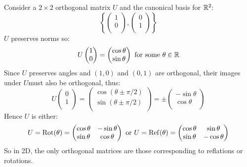 \documentclass[../main.tex]{subfiles}
\begin{document}
\begin{example}
  \label{orthoExampleR2}
  Consider a $2 \times 2$ orthogonal matrix $U$ and the canonical basis for $\mathbb{R}^2$:
  \[
    \left\{\begin{pmatrix}
    1 \\
    0 \\
    \end{pmatrix},
    \begin{pmatrix}
    0 \\
    1 \\
    \end{pmatrix}\right\}
  \]
  $U$ preserves norms so:
  \[
    U\begin{pmatrix}
    1 \\
    0 \\
    \end{pmatrix} =
    \begin{pmatrix}
    \cos \theta \\
    \sin \theta \\
    \end{pmatrix}
    \text{ for some $\theta \in \mathbb{R}$}
  \]
  Since $U$ preserves angles and $(1, 0)$ and $(0, 1)$ are orthogonal, their images under $U $must also be orthogonal, thus:
  \[
    U \begin{pmatrix}
    0 \\
    1 \\
    \end{pmatrix} =
    \begin{pmatrix}
    \cos(\theta \pm \pi/2) \\
    \sin(\theta \pm \pi/2) \\
    \end{pmatrix} =
    \pm \begin{pmatrix}
    -\sin \theta \\
    \cos \theta \\
    \end{pmatrix}
  \]
  Hence $U$ is either:
  \[
    U = \operatorname{Rot}(\theta) = \begin{pmatrix}
    \cos \theta & -\sin \theta \\
    \sin \theta & \cos \theta \\
    \end{pmatrix}
    \text{ or }
    U = \operatorname{Ref}(\theta) = \begin{pmatrix}
    \cos \theta & \sin \theta \\
    \sin \theta &  -\cos \theta \\
    \end{pmatrix}
  \]
  So in 2D, the only orthogonal matrices are those corresponding to reflations or rotations.
\end{example}
\end{document}
